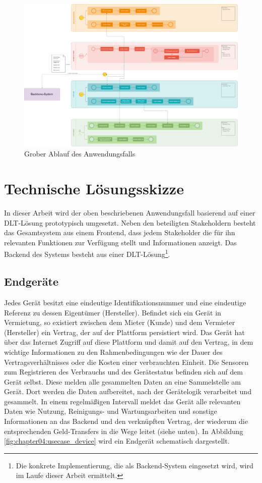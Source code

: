 \begin{figure}[htbp]
 \centering
 \includegraphics[width=1.0\textwidth]{gfx/IOT-Anwendungsfall_Ablauf.png}
 \caption{Grober Ablauf des Anwendungsfalls}
 \label{fig:chapter04:usecase_workflow}
\end{figure}

%
%
\section{Technische Lösungsskizze}
\label{sec:iot_usecase:solution}
In dieser Arbeit wird der oben beschriebenen Anwendungsfall basierend auf einer \ac{DLT}-Lösung prototypisch umgesetzt. Neben den beteiligten Stakeholdern besteht das Gesamtsystem aus einem Frontend, dass jedem Stakeholder die für ihn relevanten Funktionen zur Verfügung stellt und Informationen anzeigt. Das Backend des Systems besteht aus einer \ac{DLT}-Lösung\footnote{Die konkrete Implementierung, die als Backend-System eingesetzt wird, wird im Laufe dieser Arbeit ermittelt.}.

\subsection{Endgeräte}
\label{subsec:iot_usecase:solution:device}
Jedes Gerät besitzt eine eindeutige Identifikationsnummer und eine eindeutige Referenz zu dessen Eigentümer (Hersteller). Befindet sich ein Gerät in Vermietung, so existiert zwischen dem Mieter (Kunde) und dem Vermieter (Hersteller) ein Vertrag, der auf der Plattform persistiert wird. Das Gerät hat über das Internet Zugriff auf diese Plattform und damit auf den Vertrag, in dem wichtige Informationen zu den Rahmenbedingungen wie der Dauer des Vertragsverhältnisses oder die Kosten einer verbrauchten Einheit. Die Sensoren zum Registrieren des Verbrauchs und des Gerätestatus befinden sich auf dem Gerät selbst. Diese melden alle gesammelten Daten an eine Sammelstelle am Gerät. Dort werden die Daten aufbereitet, nach der Gerätelogik verarbeitet und gesammelt. In einem regelmäßigen Intervall meldet das Gerät alle relevanten Daten wie Nutzung, Reinigungs- und Wartungsarbeiten und sonstige Informationen an das Backend und den verknüpften Vertrag, der wiederum die entsprechenden Geld-Transfers in die Wege leitet (siehe unten). In Abbildung \ref{fig:chapter04:usecase_device} wird ein Endgerät schematisch dargestellt.


